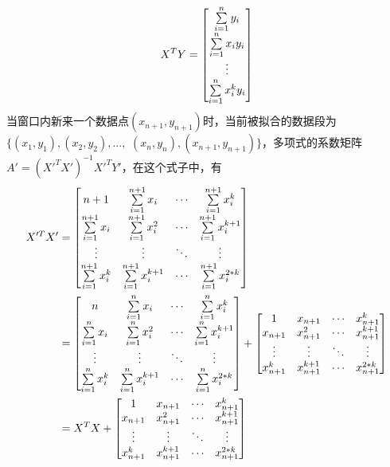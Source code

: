 \begin{equation}
X^TY = \begin{bmatrix}
{\sum_{i=1}^n \limits y_i} \\
{\sum_{i=1}^n \limits x_iy_i} \\
\vdots \\
{\sum_{i=1}^n \limits x_i^ky_i}
\end{bmatrix}
\end{equation}
当窗口内新来一个数据点$(x_{n+1},y_{n+1})$时，当前被拟合的数据段为 $\{(x_1, y_1), (x_2, y_2), ...,$ $(x_n, y_n), (x_{n+1}, y_{n+1})\}$，多项式的系数矩阵 $A' = (X'^TX')^{-1}X'^TY'$，在这个式子中，有
\begin{equation} \label{equ:equ419}
\begin{split}
X'^TX' &= \begin{bmatrix}
{n+1}&{\sum_{i=1}^{n+1} \limits x_i}& \cdots & {\sum_{i=1}^{n+1} \limits x_i^k} \\
{\sum_{i=1}^{n+1} \limits x_i}&{\sum_{i=1}^{n+1} \limits x_i^2}& \cdots & {\sum_{i=1}^{n+1} \limits x_i^{k+1}}\\
\vdots & \vdots & \ddots & \vdots \\
{\sum_{i=1}^{n+1} \limits x_i^k}&{\sum_{i=1}^{n+1} \limits x_i^{k+1}}& \cdots & {\sum_{i=1}^{n+1} \limits x_i^{2*k}}
\end{bmatrix} \\
&=
\begin{bmatrix}
n&{\sum_{i=1}^n \limits x_i}& \cdots & {\sum_{i=1}^n \limits x_i^k} \\
{\sum_{i=1}^n \limits x_i}&{\sum_{i=1}^n \limits x_i^2}& \cdots & {\sum_{i=1}^n \limits x_i^{k+1}}\\
\vdots & \vdots & \ddots & \vdots \\
{\sum_{i=1}^n \limits x_i^k}&{\sum_{i=1}^n \limits x_i^{k+1}}& \cdots & {\sum_{i=1}^n \limits x_i^{2*k}}
\end{bmatrix}
+ 
\begin{bmatrix}
1& x_{n+1} & \cdots &  x_{n+1}^k \\
x_{n+1}& x_{n+1}^2 & \cdots &  x_{n+1}^{k+1} \\
\vdots & \vdots & \ddots & \vdots \\
x_{n+1}^k& x_{n+1}^{k+1} & \cdots &  x_{n+1}^{2*k}
\end{bmatrix} \\
&=
X^TX +
\begin{bmatrix}
1& x_{n+1} & \cdots &  x_{n+1}^k \\
x_{n+1}& x_{n+1}^2 & \cdots &  x_{n+1}^{k+1} \\
\vdots & \vdots & \ddots & \vdots \\
x_{n+1}^k& x_{n+1}^{k+1} & \cdots &  x_{n+1}^{2*k}
\end{bmatrix}
\end{split} 
\end{equation}
